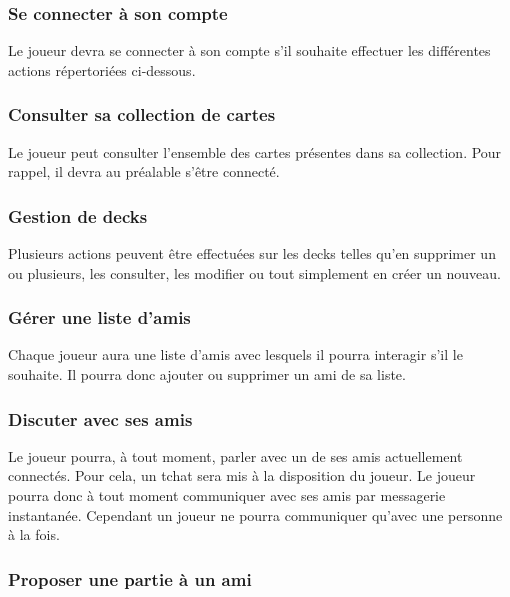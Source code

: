 \documentclass[11pt,a4paper]{article}
\begin{document}
\subsubsection*{Se connecter à son compte}

Le joueur devra se connecter à son compte s'il souhaite effectuer
les différentes actions répertoriées ci-dessous.


\subsubsection*{Consulter sa collection de cartes}

Le joueur peut consulter l'ensemble des cartes présentes dans sa
\gls{collection}. Pour rappel, il devra au préalable s'être connecté.


\subsubsection*{Gestion de decks}

Plusieurs actions peuvent être effectuées sur les decks telles
qu'en supprimer un ou plusieurs, les consulter, les modifier ou tout
simplement en créer un nouveau.


\subsubsection*{Gérer une liste d'amis}

Chaque joueur aura une liste d'amis avec lesquels il pourra
interagir s'il le souhaite. Il pourra donc ajouter ou supprimer un ami de sa liste.


\subsubsection*{Discuter avec ses amis}

Le joueur pourra, à tout moment, parler avec un de ses amis
actuellement connectés. Pour cela, un \gls{tchat} sera mis à la disposition
du joueur.  Le joueur pourra donc à tout moment communiquer avec ses amis par
messagerie instantanée. Cependant un joueur ne pourra communiquer qu'avec
une personne à la fois.

\subsubsection*{Proposer une partie à un ami}
\end{document}
